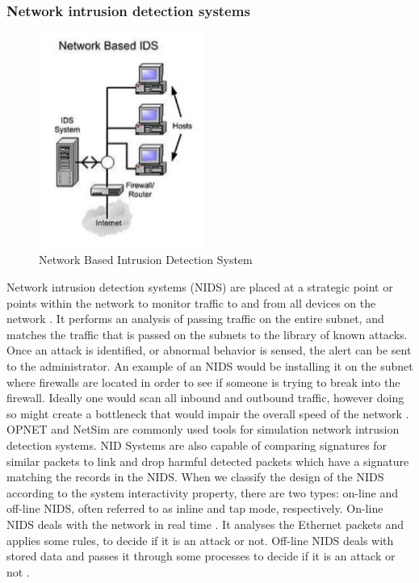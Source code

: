 \documentclass[12pt]{article}
\theoremstyle{definition}
\begin{document}
			\subsubsection{Network intrusion detection systems}
			\begin{figure}[!h]
				\centering
				\includegraphics[height=200pt]{pictures/network-based-ids.png}
				\caption{Network Based Intrusion Detection System\cite{AlEroud2017}}
				\label{fig:network-ids}
			\end{figure}
			Network intrusion detection systems (NIDS) are placed at a strategic point or points within the network to monitor traffic to and from all devices on the network \cite{Bosman2017}. It performs an analysis of passing traffic on the entire subnet, and matches the traffic that is passed on the subnets to the library of known attacks. Once an attack is identified, or abnormal behavior is sensed, the alert can be sent to the administrator. An example of an NIDS would be installing it on the subnet where firewalls are located in order to see if someone is trying to break into the firewall. Ideally one would scan all inbound and outbound traffic, however doing so might create a bottleneck that would impair the overall speed of the network \cite{Lin2017}. OPNET and NetSim are commonly used tools for simulation network intrusion detection systems. NID Systems are also capable of comparing signatures for similar packets to link and drop harmful detected packets which have a signature matching the records in the NIDS. When we classify the design of the NIDS according to the system interactivity property, there are two types: on-line and off-line NIDS, often referred to as inline and tap mode, respectively. On-line NIDS deals with the network in real time \cite{Zarpelao2017}. It analyses the Ethernet packets and applies some rules, to decide if it is an attack or not. Off-line NIDS deals with stored data and passes it through some processes to decide if it is an attack or not \cite{Lin2017}.
			
\end{document}
